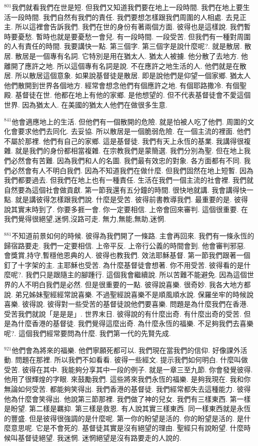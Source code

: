 \documentclass{book}
\begin{document}
$^{801}$我們就看我們在世是短.
但我們又知道我們要在地上一段時間.
我們在地上要生活一段時間.
我們自然有我們的責任.
我們要想怎樣跟我們周圍的人相處.
去見正主.
所以這裡會告訴我們.
我們在世的身份有著兩個方面.
彼得也是這樣說.
我們暫時要憂愁.
暫時也就是要憂愁一會兒.
有一段時間.
一段受苦.
但我們有一種對周圍的人有責任的時間.
我要講快一點.
第三個字.
第三個字是說什麼呢?.
就是散居.
散居.
散居是一個專有名詞.
它特別是用在猶太人.
猶太人被擄.
他分散了去地方.
他離開了應許之地.
所以這個專有名詞是說.
不在應許之地生活的人.
他們就是在散居.
所以散居這個意象.
如果說基督徒是散居.
即是說他們是仰望一個家鄉.
猶太人他們散開到世界各個地方.
經常會想念他們有個應許之地.
有個耶路撒冷.
有個聖殿.
基督徒在世.
他都在地上有他的家鄉.
是他想望的.
但不代表基督徒會不愛這個世界.
因為猶太人.
在美國的猶太人他們在做很多生意.

$^{841}$他會適應地上的生活.
但他們有一個散開的危險.
就是怕被人吃了他們.
周圍的文化會要求他們去同化.
去妥協.
所以散居是一個脆弱危險.
在一個主流的裡面.
他們不屬於那裡.
他們有自己的家鄉.
這是基督徒.
我們有天上永恆的基業.
我講得很複雜.
就是我們的身份都相當複雜.
在宗教我們是蒙簡選.
我們分別為聖.
但在地上我們必然會有苦難.
因為我們和人的名圖.
我們最有效忠的對象.
各方面都有不同.
我們必然會有人不明白我們.
因為不知道我們在做什麼.
但我們固然在地上短暫.
因為我們都要過去.
但我們在地上也有一種責任.
生活在我們一個主流的社會裡.
我們就自然要為這個社會做貢獻.
第一節我還有五分鐘的時間.
很快地就講.
我會講得快一點.
就是講彼得怎樣跟我們說.
什麼是受苦.
彼得前書教導我們.
最重要的是.
彼得說其實末時到了.
你要多捱一會.
你一定要相信.
上帝會回來審判.
這個很重要.
在我們覺得很絕望,迷惘,沒路可走.
無力,無能,無助,迷惘.

$^{881}$不知道前景如何的時候.
彼得為我們開了一條路.
主會再回來.
我們有一條永恆的歸宿路要走.
我們一定要相信.
上帝平反.
上帝行公義的時間會到.
他會審判邪惡.
會獎賞,持守,暫穩他恩典的人.
彼得也教我們.
效法耶穌基督.
第一節我們跟著一個釘了十字架的主.
主耶穌也受苦.
為什麼基督徒會想著.
你不用受苦.
彼得看的是什麼呢?.
我們只是跟隨主的腳踵行.
這個我會繼續說.
所以苦難不能避免.
因為這個世界的人不明白我們是必然.
但是很重要的一點.
彼得說喜樂.
很奇妙.
我各大地方都說.
弟兄姊妹聖經經常說喜樂.
不過聖經說喜樂不是順風順水說.
保羅坐牢的時候說喜樂.
彼得說.
彼得對一些受苦的基督徒說他們要喜樂.
問題是為什麼我們在香港.
受苦我們就說「是是是」.
世界末日.
彼得說的有什麼出奇.
有什麼出奇的受苦.
但是為什麼香港的基督徒.
我們覺得這麼出奇.
為什麼永恆的福樂.
不足夠我們去喜樂呢?.
這個我們經常要問為什麼.
我們第一代的先賢先成.

$^{921}$他們會為將來的福樂.
他們寧願死都可以.
我們現在當我們的信仰.
好像課外活動.
問題在那裡.
所以我們不如看看.
彼得一些經文.
提示我們如何明白.
什麼叫做受苦.
彼得在其中.
我能夠分享其中一段的例子.
就是一章三至九節.
你會發覺彼得.
他用了很輝煌的字眼.
來鼓勵我們.
這些將來我們永恆的福樂.
是夠我現在.
我和你無論如何受苦.
都能夠笑得出.
我們香港的基督徒.
我們經常都失去這種能力.
彼得他為什麼會笑得出.
他說第三節那裡.
我們做了神的兒女.
我們有三樣東西.
第一樣是盼望.
第二樣是羈抑.
第三樣是救恩.
有人說其實三樣東西.
同一樣東西就是永恆的豐盛.
但是彼得很強調的是什麼呢.
第一你的盼望是活的.
你的盼望是活的.
是什麼意思呢.
它是不會死的.
基督徒其實是沒有絕望的理由.
聖經只有說盼望.
什麼時候叫基督徒絕望.
我迷惘.
迷惘絕望是沒有路要走的人說的.
\end{document}
